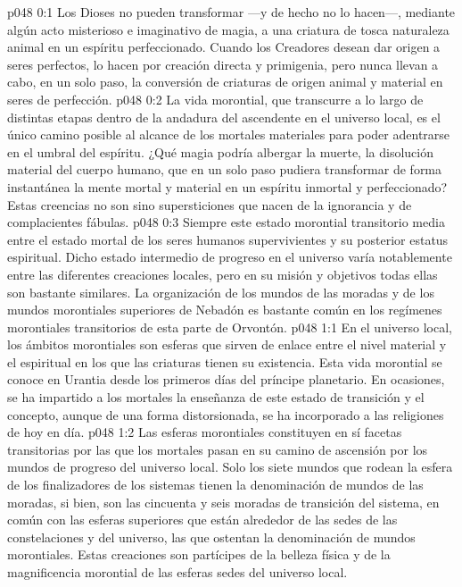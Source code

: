 \author{Arcángel}
\vs p048 0:1 Los Dioses no pueden transformar ---y de hecho no lo hacen---, mediante algún acto misterioso e imaginativo de magia, a una criatura de tosca naturaleza animal en un espíritu perfeccionado. Cuando los Creadores desean dar origen a seres perfectos, lo hacen por creación directa y primigenia, pero nunca llevan a cabo, en un solo paso, la conversión de criaturas de origen animal y material en seres de perfección.
\vs p048 0:2 La vida morontial, que transcurre a lo largo de distintas etapas dentro de la andadura del ascendente en el universo local, es el único camino posible al alcance de los mortales materiales para poder adentrarse en el umbral del espíritu. ¿Qué magia podría albergar la muerte, la disolución material del cuerpo humano, que en un solo paso pudiera transformar de forma instantánea la mente mortal y material en un espíritu inmortal y perfeccionado? Estas creencias no son sino supersticiones que nacen de la ignorancia y de complacientes fábulas.
\vs p048 0:3 Siempre este estado morontial transitorio media entre el estado mortal de los seres humanos supervivientes y su posterior estatus espiritual. Dicho estado intermedio de progreso en el universo varía notablemente entre las diferentes creaciones locales, pero en su misión y objetivos todas ellas son bastante similares. La organización de los mundos de las moradas y de los mundos morontiales superiores de Nebadón es bastante común en los regímenes morontiales transitorios de esta parte de Orvontón.
\vs p048 1:1 En el universo local, los ámbitos morontiales son esferas que sirven de enlace entre el nivel material y el espiritual en los que las criaturas tienen su existencia. Esta vida morontial se conoce en Urantia desde los primeros días del príncipe planetario. En ocasiones, se ha impartido a los mortales la enseñanza de este estado de transición y el concepto, aunque de una forma distorsionada, se ha incorporado a las religiones de hoy en día.
\vs p048 1:2 Las esferas morontiales constituyen en sí facetas transitorias por las que los mortales pasan en su camino de ascensión por los mundos de progreso del universo local. Solo los siete mundos que rodean la esfera de los finalizadores de los sistemas tienen la denominación de mundos de las moradas, si bien, son las cincuenta y seis moradas de transición del sistema, en común con las esferas superiores que están alrededor de las sedes de las constelaciones y del universo, las que ostentan la denominación de mundos morontiales. Estas creaciones son partícipes de la belleza física y de la magnificencia morontial de las esferas sedes del universo local.
